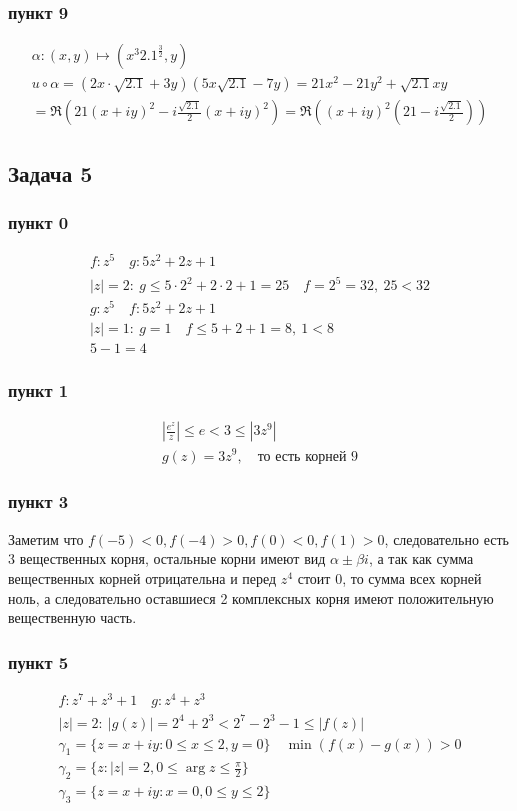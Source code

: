 \subsubsection*{пункт 9}
	\begin{gather*}
		\alpha: (x,y) \mapsto (x^3 2.1^{\frac{3}{2}}, y)\\
		u \circ \alpha = (2x \cdot \sqrt{2.1} + 3y)(5x \sqrt{2.1} - 7y)
		= 21x^2 - 21y^2 + \sqrt{2.1}xy\\
		= \Re(21(x+iy)^2 - i \frac{\sqrt{2.1}}{2}(x+iy)^2)
		= \Re((x+iy)^2(21 - i \frac{\sqrt{2.1}}{2}))
	\end{gather*}
\vskip 0.4in

\subsection*{Задача 5}
\subsubsection*{пункт 0}
	\begin{gather*}
		f: z^5\quad g: 5z^2 + 2z + 1\\
		|z|=2:\ g \leqslant 5 \cdot 2^2 + 2 \cdot 2 + 1 = 25\quad f = 2^5 = 32,\ 25 < 32\\
		g: z^5\quad f: 5z^2 + 2z + 1\\
		|z|=1:\ g = 1\quad f \leqslant 5 + 2 + 1 = 8,\ 1 < 8\\
		5 - 1 = 4
	\end{gather*}
\subsubsection*{пункт 1}
	\begin{gather*}
		\left|\frac{e^z}{z}\right| \leqslant e < 3 \leqslant |3z^9|\\
		g(z) = 3z^9,\quad \text{то есть корней } 9
	\end{gather*}
\subsubsection*{пункт 3}
	Заметим что $f(-5) < 0, f(-4) > 0, f(0) < 0, f(1) > 0$, следовательно есть 3 вещественных корня, остальные корни имеют вид $\alpha \pm \beta i$, а так как сумма вещественных корней отрицательна и перед $z^4$ стоит 0, то сумма всех корней ноль, а следовательно оставшиеся 2 комплексных корня имеют положительную вещественную часть.
\subsubsection*{пункт 5}
	\begin{gather*}
		f: z^7 + z^3 + 1\quad g: z^4 + z^3\\
		|z| = 2:\ |g(z)| = 2^4 + 2^3 < 2^7 - 2^3 - 1 \leqslant |f(z)|\\
		\gamma_1 = \{z = x+iy: 0 \leqslant x \leqslant 2, y = 0\}\quad \min(f(x) - g(x)) > 0\\
		\gamma_2 = \{z: |z| = 2, 0 \leqslant \arg z \leqslant \frac{\pi}{2}\}\\
		\gamma_3 = \{z = x + iy: x = 0, 0 \leqslant y \leqslant 2\} 
	\end{gather*}
